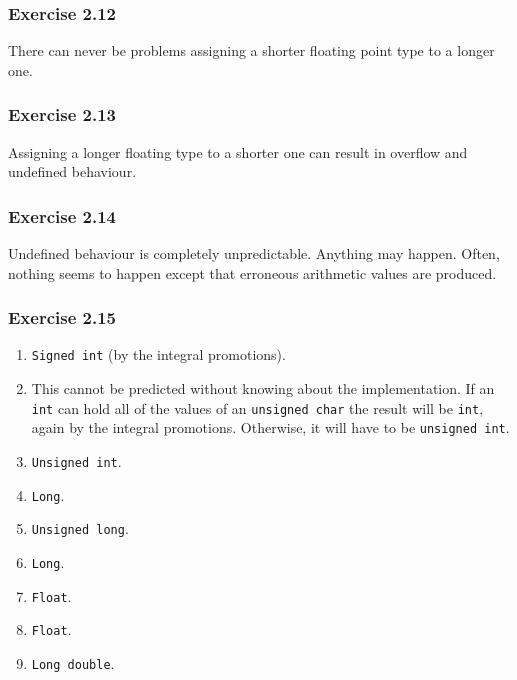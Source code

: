   

  \subsubsection*{Exercise 2.12}

   There can never be problems assigning a shorter floating point type to
    a longer one.


  

  \subsubsection*{Exercise 2.13}

   Assigning a longer floating type to a shorter one can result in overflow
    and undefined behaviour.


  

  \subsubsection*{Exercise 2.14}

   Undefined behaviour is completely unpredictable. Anything may happen.
    Often, nothing seems to happen except that erroneous arithmetic values are
    produced.


  

  \subsubsection*{Exercise 2.15}

   \begin{enumerate}
    \item \texttt{Signed int} (by the integral promotions).

    \item This cannot be predicted without knowing about the implementation.
     If an \texttt{int} can hold all of the values of an \texttt{unsigned
     char} the result will be \texttt{int}, again by the integral
     promotions. Otherwise, it will have to be \texttt{unsigned int}.

    \item \texttt{Unsigned int}.
    \item \texttt{Long}.
    \item \texttt{Unsigned long}.
    \item \texttt{Long}.
    \item \texttt{Float}.
    \item \texttt{Float}.
    \item \texttt{Long double}.
   \end{enumerate}

